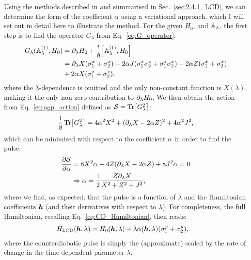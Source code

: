 Using the methods described in \cite{sels_minimizing_2017} and summarised in Sec.~\ref{sec:2.4.1_LCD}, we can determine the form of the coefficient $\alpha$ using a variational approach, which I will set out in detail here to illustrate the method. For the given $H_0$, and $\mathbb{A}_{\lambda}$, the first step is to find the operator $G_{\lambda}$ from Eq.~\ref{eq:G_operator}:
\begin{equation}
    \begin{aligned}
        G_{\lambda}(\approxAGP^{(1)}, H_0) &= \dlambda H_0 + \frac{i}{\hbar} \comm{\approxAGP^{(1)}}{H_0} \\
        &= \dlambda {X} (\sx_{1} + \sx_{2}) - 2 \alpha J (\sx_1\sz_2 + \sz_1\sx_2) - 2 \alpha Z (\sx_{1} + \sx_{2}) \\
        &+ 2 \alpha X (\sz_{1} + \sz_{2}),
    \end{aligned}
\end{equation}
where the $\lambda$-dependence is omitted and the only non-constant function is $X(\lambda)$, making it the only non-zerp contribution to $\partial_{\lambda} H_0$. We then obtain the action from Eq.~\eqref{eq:agp_action} defined as $\mathcal{S} = \Tr[G^2_{\lambda}]$:
\begin{equation}
    \frac{1}{8} \Tr[G^2_{\lambda}] = 4 \alpha^2 X^2 + (\partial_{\lambda} X - 2 \alpha Z)^2 + 4 \alpha^2 J^2,
\end{equation}
which can be minimised with respect to the coefficient $\alpha$ in order to find the  pulse:
\begin{equation}
    \begin{aligned}
        \frac{\partial \mathcal{S}}{\partial \alpha} &= 8X^2\alpha - 4Z(\partial_{\lambda} X - 2 \alpha Z) + 8 J^2 \alpha = 0 \\
        & \Rightarrow \alpha = \frac{1}{2} \frac{Z \partial_{\lambda} X}{X^2 + Z^2 + J^2},
    \end{aligned}
\end{equation}
where we find, as expected, that the  pulse is a function of $\lambda$ and the Hamiltonian coefficients $\boldsymbol{h}$ (and their derivatives with respect to $\lambda$). For completeness, the full  Hamiltonian, recalling Eq.~\eqref{eq:CD_Hamiltonian}, then reads:
\begin{equation}\label{eq:FO_LCD_H}
    \begin{aligned}
        H_{\rm LCD}(\boldsymbol{h}, \lambda) &= H_0(\boldsymbol{h}, \lambda) + \dot{\lambda} \alpha(\boldsymbol{h}, \lambda) (\sigma^y_{1} + \sigma^y_{2}),
    \end{aligned}
\end{equation}
where the counterdiabatic pulse is simply the (approximate)  scaled by the rate of change in the time-dependent parameter $\lambda$.

